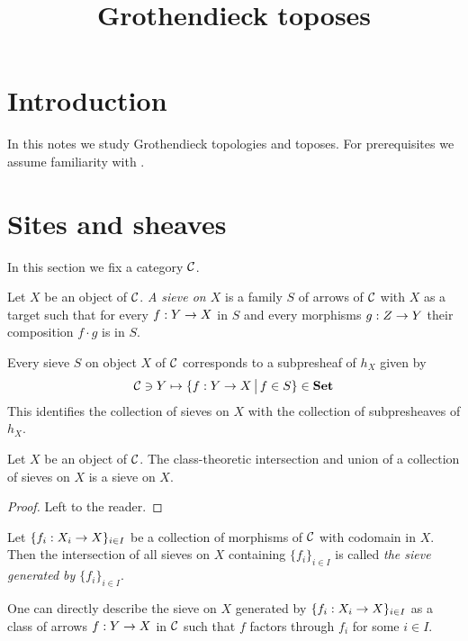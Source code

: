 



\title{Grothendieck toposes}
\date{}
\maketitle

\section{Introduction}
\noindent
In this notes we study Grothendieck topologies and toposes. For prerequisites we assume familiarity with \cite{Presheaves}.

\section{Sites and sheaves}
\noindent
In this section we fix a category ${\mathcal C}$.

\begin{definition}
Let $X$ be an object of ${\mathcal C}$. \textit{A sieve on $X$} is a family $S$ of arrows of ${\mathcal C}$ with $X$ as a target such that for every $f:Y\rightarrow X$ in $S$ and every morphisms $g:Z\rightarrow Y$ their composition $f\cdot g$ is in $S$.
\end{definition}
\noindent
Every sieve $S$ on object $X$ of ${\mathcal C}$ corresponds to a subpresheaf of $h_X$ given by
$${\mathcal C}\ni Y\mapsto \{f:Y\rightarrow X\,\big|\,f\in S\}\in \mathbf{Set}$$
This identifies the collection of sieves on $X$ with the collection of subpresheaves of $h_X$.

\begin{fact}\label{fact:propertiesofsieves}
Let $X$ be an object of ${\mathcal C}$. The class-theoretic intersection and union of a collection of sieves on $X$ is a sieve on $X$.
\end{fact}
\begin{proof}
Left to the reader.
\end{proof}

\begin{definition}
Let $\{f_i:X_i\rightarrow X\}_{i\in I}$ be a collection of morphisms of ${\mathcal C}$ with codomain in $X$. Then the intersection of all sieves on $X$ containing $\{f_i\}_{i\in I}$ is called \textit{the sieve generated by $\{f_i\}_{i\in I}$}.
\end{definition}
\noindent
One can directly describe the sieve on $X$ generated by $\{f_i:X_i\rightarrow X\}_{i\in I}$ as a class of arrows $f:Y\rightarrow X$ in ${\mathcal C}$ such that $f$ factors through $f_i$ for some $i\in I$. 

